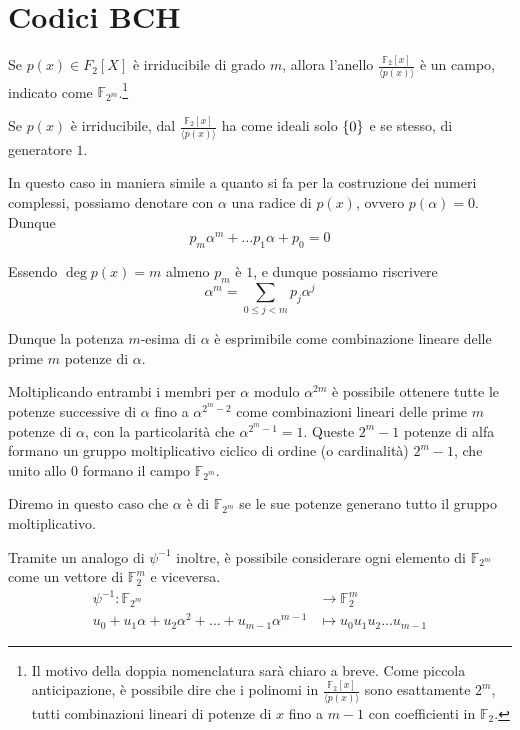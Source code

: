 \section{Codici BCH}

Se \(p(x) \in F_2[X]\) è irriducibile di grado \(m\), allora l'anello \(\frac{\mathbb{F}_2[x]}{\langle p(x) \rangle}\) è un campo, indicato come \(\mathbb{F}_{2^m}\).\footnote{Il motivo della doppia nomenclatura sarà chiaro a breve. Come piccola anticipazione, è possibile dire che i polinomi in \(\frac{\mathbb{F}_2[x]}{\langle p(x) \rangle}\) sono esattamente \(2^m\), tutti combinazioni lineari di potenze di \(x\) fino a \(m-1\) con coefficienti in \(\mathbb{F}_2\).}

\begin{note}{}
  Se \(p(x)\) è irriducibile, dal  \(\frac{\mathbb{F}_2[x]}{\langle p(x) \rangle}\) ha come ideali solo \(\set{0}\) e se stesso, di generatore \(1\).
\end{note}

In questo caso in maniera simile a quanto si fa per la costruzione dei numeri complessi, possiamo denotare con \(\alpha\) una radice  di \(p(x)\), ovvero \(p(\alpha) = 0\).
Dunque
\[p_{m}\alpha^m+\ldots p_1\alpha+p_0 = 0\]

Essendo \(\deg p(x) = m\) almeno \(p_m\) è \(1\), e dunque possiamo riscrivere
\[\alpha^m = \sum_{0\leq j < m } p_j \alpha^j\]

Dunque la potenza \(m\)-esima di \(\alpha\) è esprimibile come combinazione lineare delle prime \(m\) potenze di \(\alpha\).

Moltiplicando entrambi i membri per \(\alpha\) modulo \(\alpha^{2m}\) è possibile ottenere tutte le potenze successive di \(\alpha\) fino a \(\alpha^{2^m-2}\) come combinazioni lineari delle prime \(m\) potenze di \(\alpha\), con la particolarità che \(\alpha^{2^m-1} = 1\).
Queste \(2^{m}-1\) potenze di alfa formano un gruppo moltiplicativo ciclico di ordine (o cardinalità) \(2^m-1\), che unito allo \(0\) formano il campo \(\mathbb{F}_{2^m}\).

Diremo in questo caso che \(\alpha\) è  di \(\mathbb{F}_{2^m}\) se le sue potenze generano tutto il gruppo moltiplicativo.

Tramite un analogo di \(\psi^{-1}\) inoltre, è possibile considerare ogni elemento di \(\mathbb{F}_{2^m}\) come un vettore di \(\mathbb{F}_2^m\) e viceversa.
\[\begin{aligned}
  \psi^{-1}: \mathbb{F}_{2^m} &\to \mathbb{F}_2^m \\
  u_0 + u_1 \alpha + u_2 \alpha^2 + \ldots + u_{m-1} \alpha^{m-1} &\mapsto u_0 u_1 u_2 \ldots u_{m-1}
\end{aligned}\]

